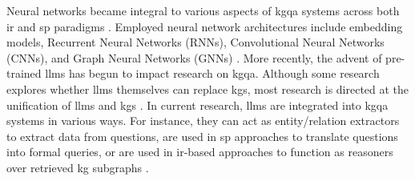  Neural networks became integral to various aspects of \gls{kgqa} systems across both \gls{ir} and \gls{sp} paradigms \cite{chakraborty_introduction_2019,ji_survey_2022}. Employed neural network architectures include embedding models, Recurrent Neural Networks (RNNs), Convolutional Neural Networks (CNNs), and Graph Neural Networks (GNNs) \cite{chakraborty_introduction_2021,pan_unifying_2024,ji_survey_2022}. More recently, the advent of pre-trained \glspl{llm} has begun to impact research on \gls{kgqa}. Although some research explores whether \glspl{llm} themselves can replace \glspl{kg}, most research is directed at the unification of \glspl{llm} and \glspl{kg} \cite{pan_unifying_2024}. In current research, \glspl{llm} are integrated into \gls{kgqa} systems in various ways. For instance, they can act as entity/relation extractors to extract data from questions, are used in \gls{sp} approaches to translate questions into formal queries, or are used in \gls{ir}-based approaches to function as reasoners over retrieved \gls{kg} subgraphs \cite{pan_unifying_2024}.






